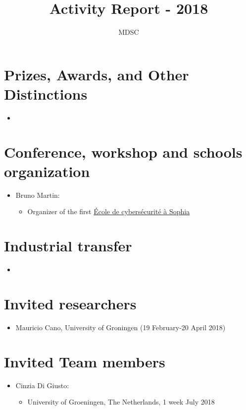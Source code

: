 \documentclass[a4paper]{article}
\title{Activity Report - 2018}
\author{MDSC}
\begin{document}
\maketitle

\section{Prizes, Awards, and Other Distinctions}
\begin{itemize}
 \item 
\end{itemize}

\section{Conference, workshop and schools organization}
\begin{itemize}
 \item Bruno Martin:
 \begin{itemize}
     \item Organizer of the first \href{http://univ-cotedazur.fr/events/ecole-de-cybersecurite}{\'Ecole de cybersécurité à Sophia}
 \end{itemize}
\end{itemize}

\section{Industrial transfer}
\begin{itemize}
 \item
\end{itemize}


\section{Invited researchers}

\begin{itemize}
 
 \item Mauricio Cano, University of Groningen  (19 February-20 April 2018) 
 
 
\end{itemize}

\section{Invited Team members}

\begin{itemize}

 \item Cinzia Di Giusto:
 \begin{itemize}
  \item University of Groeningen, The Netherlands, 1 week July 2018
\end{itemize}
\end{itemize}
\end{document}
